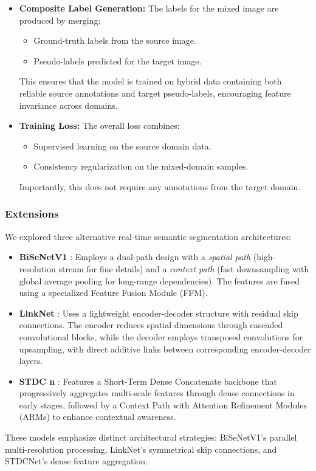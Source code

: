 \documentclass{article}
\begin{document}
\begin{multicols}{2}
\begin{itemize}
		\item \textbf{Composite Label Generation:}
		The labels for the mixed image are produced by merging:
		\begin{itemize}
			\item Ground-truth labels from the source image.
			\item Pseudo-labels predicted for the target image.
		\end{itemize}
		This ensures that the model is trained on hybrid data containing both reliable source annotations and target pseudo-labels, encouraging feature invariance across domains.
		

		\item \textbf{Training Loss:} 
		The overall loss combines:
		\begin{itemize}
			\item Supervised learning on the source domain data.
			\item Consistency regularization on the mixed-domain samples.
		\end{itemize}
		Importantly, this does not require any annotations from the target domain.
		

	\end{itemize}
	
		
		\subsubsection{Extensions}
		We explored three alternative real-time semantic segmentation architectures:
		\begin{itemize}
			\item \textbf{BiSeNetV1} \cite{yu2018bisenet}: Employs a dual-path design with a \textit{spatial path} (high-resolution stream for fine details) and a \textit{context path} (fast downsampling with global average pooling for long-range dependencies). The features are fused using a specialized Feature Fusion Module (FFM).
			\item \textbf{LinkNet} \cite{chaurasia2017linknet}: Uses a lightweight encoder-decoder structure with residual skip connections. The encoder reduces spatial dimensions through cascaded convolutional blocks, while the decoder employs transposed convolutions for upsampling, with direct additive links between corresponding encoder-decoder layers.
			\item \textbf{STDC n} \cite{fan2021rethinking}: Features a Short-Term Dense Concatenate backbone that progressively aggregates multi-scale features through dense connections in early stages, followed by a Context Path with Attention Refinement Modules (ARMs) to enhance contextual awareness.
		\end{itemize}
		These models emphasize distinct architectural strategies: BiSeNetV1's parallel multi-resolution processing, LinkNet's symmetrical skip connections, and STDCNet's dense feature aggregation.
		

\end{multicols}
\end{document}
